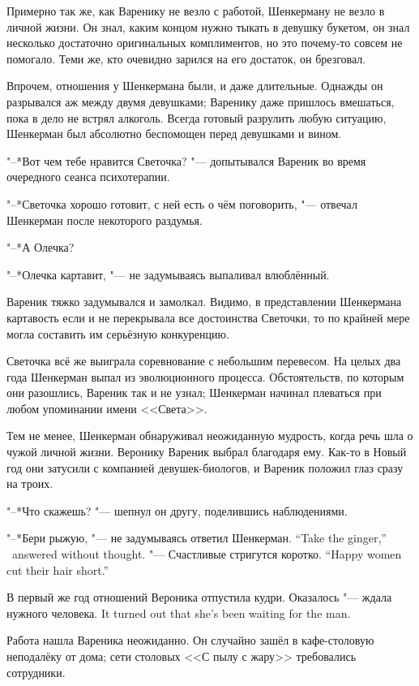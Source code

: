 Примерно так же, как Варенику не везло с работой, Шенкерману не везло в личной жизни.
Он знал, каким концом нужно тыкать в девушку букетом, он знал несколько достаточно оригинальных комплиментов, но это почему-то совсем не помогало.
Теми же, кто очевидно зарился на его достаток, он брезговал.

Впрочем, отношения у Шенкермана были, и даже длительные.
Однажды он разрывался аж между двумя девушками;
Варенику даже пришлось вмешаться, пока в дело не встрял алкоголь.
Всегда готовый разрулить любую ситуацию, Шенкерман был абсолютно беспомощен перед девушками и вином.

"--*Вот чем тебе нравится Светочка? "--- допытывался Вареник во время очередного сеанса психотерапии.

"--*Светочка хорошо готовит, с ней есть о чём поговорить, "--- отвечал Шенкерман после некоторого раздумья.

"--*А Олечка?

"--*Олечка картавит, "--- не задумываясь выпаливал влюблённый.

Вареник тяжко задумывался и замолкал.
Видимо, в представлении Шенкермана картавость если и не перекрывала все достоинства Светочки, то по крайней мере могла составить им серьёзную конкуренцию.

Светочка всё же выиграла соревнование с небольшим перевесом.
На целых два года Шенкерман выпал из эволюционного процесса.
Обстоятельств, по которым они разошлись, Вареник так и не узнал;
Шенкерман начинал плеваться при любом упоминании имени <<Света>>.

Тем не менее, Шенкерман обнаруживал неожиданную мудрость, когда речь шла о чужой личной жизни.
Веронику Вареник выбрал благодаря ему.
Как-то в Новый год они затусили с компанией девушек-биологов, и Вареник положил глаз сразу на троих.

"--*Что скажешь? "--- шепнул он другу, поделившись наблюдениями.

{"--*Бери рыжую, "--- не задумываясь ответил Шенкерман.}
{``Take the ginger,'' \Shenkerman\  answered without thought.}
{"--- Счастливые стригутся коротко.}
{``Happy women cut their hair short.''}

В первый же год отношений Вероника отпустила кудри.
{Оказалось "--- ждала нужного человека.}
{It turned out that she's been waiting for the man.}

\asterism

\label{Tue_2012_04_24}

Работа нашла Вареника неожиданно.
Он случайно зашёл в кафе-столовую неподалёку от дома;
сети столовых <<С пылу с жару>> требовались сотрудники.

